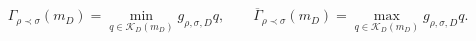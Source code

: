 \[\Gamma_{\rho\prec\sigma}(m_D)=\min_{q\in\mathcal K_D(m_D)}g_{\rho,\sigma,D}q,\qquad \overline\Gamma_{\rho\prec\sigma}(m_D)=\max_{q\in\mathcal K_D(m_D)}g_{\rho,\sigma,D}q.\]